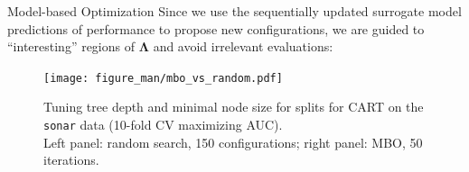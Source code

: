 \documentclass[11pt,compress,t,notes=noshow, xcolor=table]{beamer}
\begin{document}
\begin{vbframe}{Model-based Optimization}
Since we use the sequentially updated surrogate model predictions of performance to propose new configurations,
we are guided to \enquote{interesting} regions of $\bm{\Lambda}$ and avoid irrelevant evaluations:
  
  \begin{center}
\begin{figure}
\texttt{[image: figure\_man/mbo\_vs\_random.pdf]}
\caption{\footnotesize{Tuning tree depth and minimal node size for splits for CART on the \texttt{sonar} data (10-fold CV maximizing AUC). \\
  Left panel: random search, 150 configurations; right panel: MBO, 50 iterations.}}
\end{figure}
\end{center}


\end{vbframe}
\end{document}
